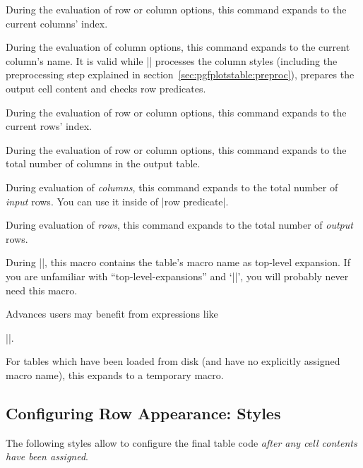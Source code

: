 \begin{command}{\pgfplotstablecol}
	During the evaluation of row or column options, this command expands to the current columns' index.
\end{command}
\begin{command}{\pgfplotstablecolname}
	During the evaluation of column options, this command expands to the current column's name. It is valid while |\pgfplotstabletypeset| processes the column styles (including the preprocessing step explained in section~\ref{sec:pgfplotstable:preproc}), prepares the output cell content and checks row predicates.
\end{command}
\label{pgfplotstable:page:tablerow}
\begin{command}{\pgfplotstablerow}
	During the evaluation of row or column options, this command expands to the current rows' index.
\end{command}
\begin{command}{\pgfplotstablecols}
	During the evaluation of row or column options, this command expands to the total number of columns in the output table.
\end{command}
\begin{command}{\pgfplotstablerows}
	During evaluation of \emph{columns}, this command expands to the total number of \emph{input} rows. You can use it inside of |row predicate|.

	During evaluation of \emph{rows}, this command expands to the total number of \emph{output} rows.
\end{command}
\begin{command}{\pgfplotstablename}
	During |\pgfplotstabletypeset|, this macro contains the table's macro name as top-level expansion. If you are unfamiliar with ``top-level-expansions'' and `|\expandafter|', you will probably never need this macro.
	
	Advances users may benefit from expressions like 
	
	|\expandafter\pgfplotstabletypeset\pgfplotstablename|.

	For tables which have been loaded from disk (and have no explicitly assigned macro name), this expands to a temporary macro.
\end{command}


\subsection{Configuring Row Appearance: Styles}
The following styles allow to configure the final table code \emph{after any cell contents have been assigned}.

